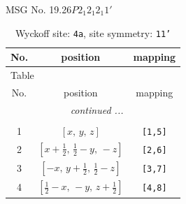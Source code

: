 \documentclass[fleqn,8pt]{jsarticle}
\begin{document}
\setcounter{MaxMatrixCols}{32}

\renewcommand{\tablename}{Table~}
\renewcommand{\figurename}{Figure~}
\begin{center}
\LARGE
MSG No. 19.26\quad$P2_{1}2_{1}2_{1}1'$
\end{center}
\renewcommand{\arraystretch}{1.2}
\begin{longtable}{ccc}
\caption{Wyckoff site: {\tt 4a}, site symmetry: {\tt 11'}}
 \\
 \hline \hline
No. & position & mapping \\ \hline \endfirsthead

\multicolumn{2}{l}{\tablename\ \thetable{}} \\
 \hline \hline
No. & position & mapping \\ \hline \endhead

 \hline \hline
\multicolumn{2}{r}{\footnotesize\it continued ...} \\ \endfoot

 \hline \hline
\multicolumn{2}{r}{} \\ \endlastfoot

1 & $\left[ x,\, y,\, z \right]$ & {\tt [1,5]} \\ \hline
2 & $\left[ x + \frac{1}{2},\, \frac{1}{2} - y,\, - z \right]$ & {\tt [2,6]} \\ \hline
3 & $\left[ - x,\, y + \frac{1}{2},\, \frac{1}{2} - z \right]$ & {\tt [3,7]} \\ \hline
4 & $\left[ \frac{1}{2} - x,\, - y,\, z + \frac{1}{2} \right]$ & {\tt [4,8]} \\
\end{longtable}
\end{document}
